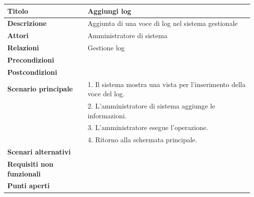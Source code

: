 \documentclass[a4paper]{article}
\begin{document}


  \begin{center}
    \begin{tabularx}{1\textwidth}{l|X}
        \textbf{Titolo} & Aggiungi log \\
        \hline
        \textbf{Descrizione} & Aggiunta di una voce di log nel sistema gestionale \\
        \hline
        \textbf{Attori} & Amministratore di sistema \\
        \hline
        \textbf{Relazioni} & Gestione log \\
        \hline
        \textbf{Precondizioni} &  \\
        \hline
        \textbf{Postcondizioni} &  \\
        \hline
        \textbf{Scenario principale} & 1. Il sistema mostra una vista per l'inserimento della voce del log.\\
                                     & 2. L'amministratore di sistema aggiunge le informazioni.\\
                                     & 3. L'amministratore esegue l'operazione.\\
                                     & 4. Ritorno alla schermata principale.\\
        \hline
        \textbf{Scenari alternativi} & \\
        \hline
        \textbf{Requisiti non funzionali} & \\
        \hline
        \textbf{Punti aperti} & \\
        \hline
    \end{tabularx}
  \end{center}


\end{document}
